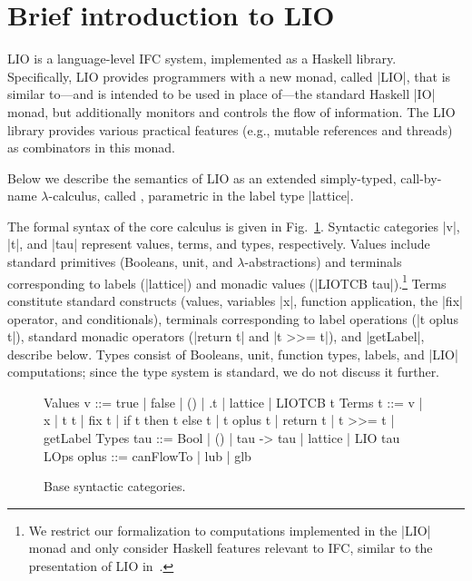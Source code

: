 \section{Brief introduction to LIO}
\label{sec:background}

LIO is a language-level IFC system, implemented as a Haskell
library.
%
Specifically, LIO provides programmers with a new monad, called |LIO|,
that is similar to---and is intended to be used in place of---the
standard Haskell |IO| monad, but additionally monitors and controls
the flow of information.
%
The LIO library provides various practical features (e.g., mutable
references and threads) as combinators in this monad.


%
Below we describe the semantics of LIO as an extended simply-typed,
call-by-name $\lambda$-calculus, called \lio, parametric in the label
type |lattice|.

The formal syntax of the core \lio{} calculus is given in
Fig.~\ref{fig:language:base}.
%
Syntactic categories |v|, |t|, and |tau| represent values, terms, and
types, respectively.
%
Values include standard primitives (Booleans, unit,
and $\lambda$-abstractions) and terminals corresponding to labels
(|lattice|) and monadic values (|LIOTCB tau|).\footnote{
We restrict our formalization to computations implemented in the |LIO|
monad and only consider Haskell features relevant to IFC, similar to
the presentation of LIO in~.
}
%
Terms constitute standard constructs (values, variables |x|, function
application, the |fix| operator, and conditionals), terminals
corresponding to label operations (|t oplus t|), standard monadic
operators (|return t| and |t >>= t|), and |getLabel|, describe below.
%
Types consist of Booleans, unit, function types, labels, and |LIO|
computations; since the \lio{} type system is standard, we do not
discuss it further.

\begin{figure}
\centering
\begin{code}
Values  v      ::=  true | false | () | \x.t | lattice | LIOTCB t
Terms   t      ::=  v | x | t t | fix t | if t then t else t
                 |  t oplus t | return t | t >>= t | getLabel
Types   tau    ::=  Bool | () | tau -> tau | lattice | LIO tau  
LOps    oplus  ::=  canFlowTo | lub | glb
\end{code}
\caption{Base \lio{} syntactic categories.
\label{fig:language:base}}
\end{figure}

